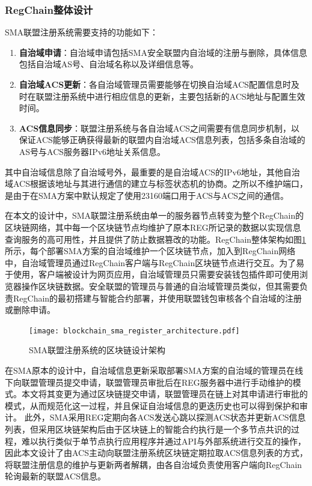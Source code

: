       \subsubsection{RegChain整体设计}
      \label{IPv6_Security:interas:design:architecture}
      SMA联盟注册系统需要支持的功能如下：
      \begin{enumerate}[1{)}]
        \item \textbf{自治域申请}：自治域申请包括SMA安全联盟内自治域的注册与删除，具体信息包括自治域AS号、自治域名称以及详细信息等。
        \item \textbf{自治域ACS更新}：各自治域管理员需要能够在切换自治域ACS配置信息时及时在联盟注册系统中进行相应信息的更新，主要包括新的ACS地址与配置生效时间。
        \item \textbf{ACS信息同步}：联盟注册系统与各自治域ACS之间需要有信息同步机制，以保证ACS能够正确获得最新的联盟内自治域ACS信息列表，包括多条自治域的AS号与ACS服务器IPv6地址关系信息。
      \end{enumerate}
      
      其中自治域信息除了自治域号外，最重要的是自治域ACS的IPv6地址，其他自治域ACS根据该地址与其进行通信的建立与标签状态机的协商。之所以不维护端口，是由于在SMA方案中默认规定了使用23160端口用于ACS与ACS之间的通信。
      
      在本文的设计中，SMA联盟注册系统由单一的服务器节点转变为整个RegChain的区块链网络，其中每一个区块链节点均维护了原本REG所记录的数据以实现信息查询服务的高可用性，并且提供了防止数据篡改的功能。RegChain整体架构如图\ref{fig:blockchain_sma_register_architecture}所示，每个部署SMA方案的自治域维护一个区块链节点，加入到RegChain网络中，自治域管理员通过RegChain客户端与RegChain区块链节点进行交互。为了易于使用，客户端被设计为网页应用，自治域管理员只需要安装钱包插件即可使用浏览器操作区块链数据。安全联盟的管理员与普通的自治域管理员类似，但其需要负责RegChain的最初搭建与智能合约部署，并使用联盟钱包审核各个自治域的注册或删除申请。
      \begin{figure}[ht]
        \centering
        \texttt{[image: blockchain\_sma\_register\_architecture.pdf]}
        \caption{SMA联盟注册系统的区块链设计架构}
        \label{fig:blockchain_sma_register_architecture}
      \end{figure}

      在SMA原本的设计中，自治域信息更新采取部署SMA方案的自治域的管理员在线下向联盟管理员提交申请，联盟管理员审批后在REG服务器中进行手动维护的模式。本文将其变更为通过区块链提交申请，联盟管理员在链上对其申请进行审批的模式，从而规范化这一过程，并且保证自治域信息的更迭历史也可以得到保护和审计。
      此外，SMA采用REG定期向各ACS发送心跳以探测ACS状态并更新ACS信息列表，但采用区块链架构后由于区块链上的智能合约执行是一个多节点共识的过程，难以执行类似于单节点执行应用程序并通过API与外部系统进行交互的操作，因此本文设计了由ACS主动向联盟注册系统区块链定期拉取ACS信息列表的方式，将联盟注册信息的维护与更新两者解耦，由各自治域负责使用客户端向RegChain轮询最新的联盟ACS信息。

